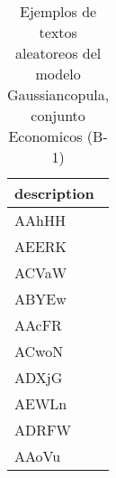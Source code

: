 \begin{table}[H]
\centering
\fontsize{8}{14}\selectfont
\caption{Ejemplos de textos aleatoreos del modelo Gaussiancopula, conjunto Economicos (B-1)}
\label{table-sample10-economicos-b-1-gaussiancopula-text}
\begin{tabular}{|m{50em}|}
\hline
\rowcolor[gray]{0.8}
description \\
\hline AAhHH \\
\hline AEERK \\
\hline ACVaW \\
\hline ABYEw \\
\hline AAcFR \\
\hline ACwoN \\
\hline ADXjG \\
\hline AEWLn \\
\hline ADRFW \\
\hline AAoVu \\
\hline
\end{tabular}
\end{table}
